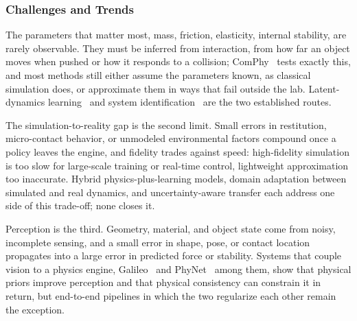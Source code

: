 \subsubsection{Challenges and Trends}
The parameters that matter most, mass, friction, elasticity, internal stability, are rarely observable. They must be inferred from interaction, from how far an object moves when pushed or how it responds to a collision; ComPhy~\cite{chen2022comphy} tests exactly this, and most methods still either assume the parameters known, as classical simulation does, or approximate them in ways that fail outside the lab. Latent-dynamics learning~\cite{battaglia2016interaction} and system identification~\cite{an1985estimation,muralidhar2020phynet} are the two established routes.

The simulation-to-reality gap is the second limit. Small errors in restitution, micro-contact behavior, or unmodeled environmental factors compound once a policy leaves the engine, and fidelity trades against speed: high-fidelity simulation is too slow for large-scale training or real-time control, lightweight approximation too inaccurate. Hybrid physics-plus-learning models, domain adaptation between simulated and real dynamics, and uncertainty-aware transfer each address one side of this trade-off; none closes it.

Perception is the third. Geometry, material, and object state come from noisy, incomplete sensing, and a small error in shape, pose, or contact location propagates into a large error in predicted force or stability. Systems that couple vision to a physics engine, Galileo~\cite{wu2015galileo} and PhyNet~\cite{muralidhar2020phynet} among them, show that physical priors improve perception and that physical consistency can constrain it in return, but end-to-end pipelines in which the two regularize each other remain the exception.
